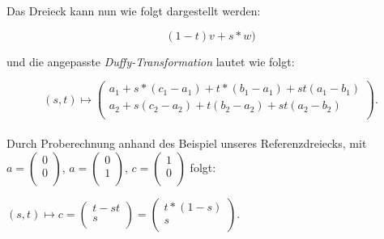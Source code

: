 \documentclass[a4paper,11pt,bibliography=totoc,listof=totoc,headinclude=true,cleardoublepage=empty,oneside]{scrbook}
\begin{document}
	\vspace{3mm}
		Das Dreieck kann nun wie folgt dargestellt werden:
		
		\vspace*{2mm}
		\begin{equation*}
			(1-t)v+s*w)
		\end{equation*}	
			
		und die angepasste \textit{Duffy-Transformation} lautet wie folgt: \\
		
	
		
		\vspace*{1mm}
		
		\begin{equation*}
				(s,t) \mapsto \left(
				\begin{array}{ccc}
				a_1 + s*(c_1-a_1)+ t*(b_1-a_1) + st(a_1-b_1)\\
				a_2 + s(c_2-a_2) + t(b_2-a_2) + st(a_2-b_2)\\
				\end{array}
				\right).
		\end{equation*} \\
		 \vspace*{5mm}
		Durch Proberechnung anhand des Beispiel unseres Referenzdreiecks, mit \\  \hspace*{0mm} $a=\left(
		\begin{array}{ccc}
		0 \\
		0\\
		\end{array}
		\right)$, $a=\left(
		\begin{array}{ccc}
		0 \\
		1\\
		\end{array}
		\right)$, $c=\left(
		\begin{array}{ccc}
		1\\
		0\\
		\end{array}
		\right)$ folgt:
		
		\vspace{3mm}
		\hspace{4.3cm}

		\vspace{2mm}
		
		
		$(s,t) \mapsto  c=\left(
		\begin{array}{ccc}
			t-st\\
			s\\
		\end{array}
		\right) = \left(
		\begin{array}{ccc}
			t*(1-s)\\
			s\\
		\end{array}
		\right)$. \newline
		
\end{document}
